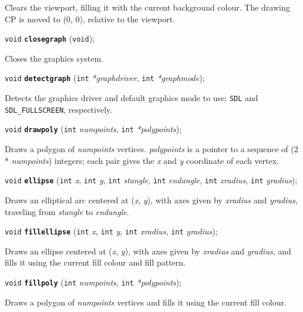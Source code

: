 \documentclass[a4paper,11pt]{article}
\newcommand{\V}{\texttt{void}}      %
\newcommand{\I}{\texttt{int}}       %
\newcommand{\func}[1]{\textbf{\texttt{#1}}}  %
\newcommand{\A}[1]{\emph{#1}}       %
\newcommand{\T}[1]{\texttt{#1}}     %
\newenvironment{bgi}
{ %
  \begin{snugshade}
}
{ %
  \end{snugshade}
}
\begin{document}
Clears the viewport, filling it with the current background colour.
The drawing CP is moved to (0, 0), relative to the viewport.


\begin{bgi}
\V{} \func{closegraph} (\V{});
\end{bgi}

Closes the graphics system.


\begin{bgi}
\V{} \func{detectgraph} (\I{} \A{*graphdriver}, \I{} \A{*graphmode});
\end{bgi}

Detects the graphics driver and default graphics mode to use; \T{SDL}
and \T{SDL\_FULLSCREEN}, respectively.


\begin{bgi}
\V{} \func{drawpoly} (\I{} \A{numpoints}, \I{} \A{*polypoints});
\end{bgi}

Draws a polygon of \A{numpoints} vertices. \A{polypoints} is a
pointer to a sequence of (2 * \A{numpoints}) integers; each pair gives
the \A{x} and \A{y} coordinate of each vertex.


\begin{bgi}
\V{} \func{ellipse} (\I{} \A{x}, \I{} \A{y}, \I{} \A{stangle}, \I{}
\A{endangle}, \I{} \A{xradius}, \I{} \A{yradius});
\end{bgi}

Draws an elliptical arc centered at (\A{x}, \A{y}), with axes given by
\A{xradius} and \A{yradius}, traveling from \A{stangle} to
\A{endangle}.


\begin{bgi}
\V{} \func{fillellipse} (\I{} \A{x}, \I{} \A{y}, \I{} \A{xradius},
\I{} \A{yradius});
\end{bgi}

Draws an ellipse centered at (\A{x}, \A{y}), with axes given by
\A{xradius} and \A{yradius}, and fills it using the current fill
colour and fill pattern.


\begin{bgi}
\V{} \func{fillpoly} (\I{} \A{numpoints}, \I{} \A{*polypoints});
\end{bgi}

Draws a polygon of \A{numpoints} vertices and fills it using the
current fill colour.
\end{document}
